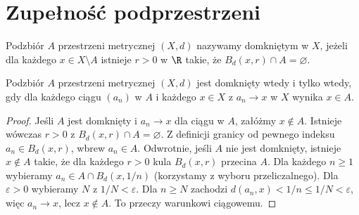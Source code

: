 \section{Zupełność podprzestrzeni}
\begin{definicja}
\label{ma1:def:closed-metric-subset}
Podzbiór $A$ przestrzeni metrycznej $(X,d)$ nazywamy domkniętym w $X$, jeżeli dla każdego $x\in X\setminus A$ istnieje $r>0$ w $\R$ takie, że $B_d(x,r)\cap A=\varnothing$.
\end{definicja}
\begin{lemat}
\label{ma1:lem:closed-sequential}
Podzbiór $A$ przestrzeni metrycznej $(X,d)$ jest domknięty wtedy i tylko wtedy, gdy dla każdego ciągu $(a_n)$ w $A$ i każdego $x\in X$ z $a_n\to x$ w $X$ wynika $x\in A$.
\end{lemat}
\begin{proof}
Jeśli $A$ jest domknięty i $a_n\to x$ dla ciągu w $A$, załóżmy $x\notin A$. Istnieje wówczas $r>0$ z $B_d(x,r)\cap A=\varnothing$. Z definicji granicy od pewnego indeksu $a_n\in B_d(x,r)$, wbrew $a_n\in A$.
Odwrotnie, jeśli $A$ nie jest domknięty, istnieje $x\notin A$ takie, że dla każdego $r>0$ kula $B_d(x,r)$ przecina $A$. Dla każdego $n\ge1$ wybieramy $a_n\in A\cap B_d(x,1/n)$ (korzystamy z wyboru przeliczalnego). Dla $\varepsilon>0$ wybieramy $N$ z $1/N<\varepsilon$. Dla $n\ge N$ zachodzi $d(a_n,x)<1/n\le1/N<\varepsilon$, więc $a_n\to x$, lecz $x\notin A$. To przeczy warunkowi ciągowemu.
\end{proof}

